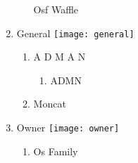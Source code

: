 \documentclass{article}
\begin{document}
\begin{enumerate}[I]
\begin{enumerate}[I]
	Osf Waffle
    \end{enumerate}
  \item
    General \texttt{[image: general]}
    \begin{enumerate}[I]
      \item
	A D M A N
	\begin{enumerate}[I]
	  \item
	    A\textunderscore D\textunderscore M\textunderscore N
	\end{enumerate}
      \item
	Moncat
    \end{enumerate}
  \item
    Owner \texttt{[image: owner]}
    \begin{enumerate}[I]
      \item
	Os Family
    \end{enumerate}
\end{enumerate}
\end{document}
